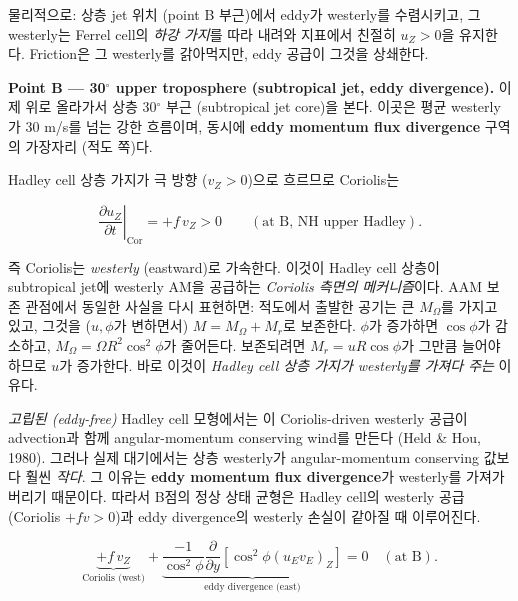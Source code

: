 물리적으로: 상층 jet 위치 (point B 부근)에서 eddy가 westerly를 수렴시키고,
그 westerly는 Ferrel cell의 \emph{하강 가지}를 따라 내려와 지표에서 친절히
$u_Z > 0$을 유지한다.  Friction은 그 westerly를 갉아먹지만, eddy 공급이
그것을 상쇄한다.



\medskip



\noindent\textbf{Point B --- 30$^\circ$ upper troposphere (subtropical jet, eddy divergence).}
이제 위로 올라가서 상층 30$^\circ$ 부근 (subtropical jet core)을 본다.
이곳은 평균 westerly가 30 m/s를 넘는 강한 흐름이며, 동시에 \textbf{eddy
momentum flux divergence} 구역의 가장자리 (적도 쪽)다.

Hadley cell 상층 가지가 극 방향 ($v_Z > 0$)으로 흐르므로 Coriolis는

\begin{equation}\label{eq:ch07_temp_pointB}
  \left.\frac{\partial u_Z}{\partial t}\right|_{\text{Cor}}
    = +f\,v_Z > 0 \qquad (\text{at B, NH upper Hadley}).
\end{equation}

\noindent
즉 Coriolis는 \emph{westerly} (eastward)로 가속한다.  이것이 Hadley cell
상층이 subtropical jet에 westerly AM을 공급하는 \emph{Coriolis 측면의 메커니즘}이다.
AAM 보존 관점에서 동일한 사실을 다시 표현하면: 적도에서 출발한 공기는 큰
$M_\Omega$를 가지고 있고, 그것을 ($u, \phi$가 변하면서) $M = M_\Omega + M_r$로
보존한다.  $\phi$가 증가하면 $\cos\phi$가 감소하고, $M_\Omega = \Omega
R^2\cos^2\phi$가 줄어든다.  보존되려면 $M_r = u R\cos\phi$가 그만큼 늘어야
하므로 $u$가 증가한다.  바로 이것이 \emph{Hadley cell 상층 가지가 westerly를
가져다 주는} 이유다.

\emph{고립된 (eddy-free)} Hadley cell 모형에서는 이 Coriolis-driven westerly
공급이 advection과 함께 angular-momentum conserving wind를 만든다 (Held \&
Hou, 1980).  그러나 실제 대기에서는 상층 westerly가 angular-momentum
conserving 값보다 훨씬 \emph{작다}.  그 이유는 \textbf{eddy momentum flux
divergence}가 westerly를 가져가버리기 때문이다.  따라서 B점의 정상 상태
균형은 Hadley cell의 westerly 공급(Coriolis $+fv > 0$)과 eddy divergence의
westerly 손실이 같아질 때 이루어진다.

\begin{equation}\label{eq:ch07_temp_pointB_bal}
  \boxed{
    \underbrace{+f\,v_Z}_{\text{Coriolis (west)}}
    + \underbrace{\frac{-1}{\cos^2\phi}\frac{\partial}{\partial y}
      [\cos^2\phi(u_E v_E)_Z]}_{\text{eddy divergence (east)}}
    = 0 \quad (\text{at B}).
  }
\end{equation}

